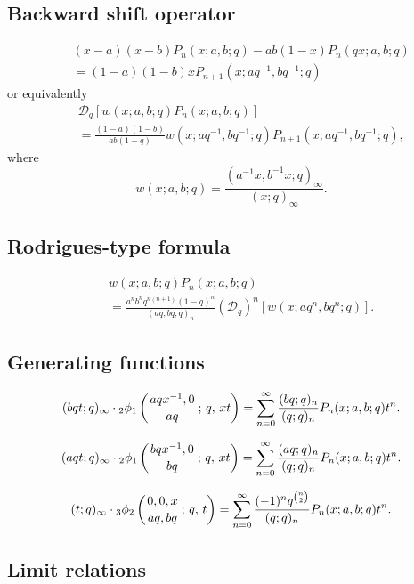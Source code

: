 \documentclass[envcountchap,graybox]{svmono}
\newcommand{\qhyp}[5]{\mbox{}_{#1}{\phi}_{#2}
\left(\genfrac{}{}{0pt}{}{#3}{#4}\,;\,q,\,#5\right)}
\newcommand{\qhyp}[5]{\,\mbox{}_{#1}\phi_{#2}\!\left(
  \genfrac{}{}{0pt}{}{#3}{#4};#5\right)}
\begin{document}
\subsection*{Backward shift operator}
\begin{eqnarray}
\label{shift2BigqLaguerreI}
& &(x-a)(x-b)P_n(x;a,b;q)-ab(1-x)P_n(qx;a,b;q)\nonumber\\
& &{}=(1-a)(1-b)xP_{n+1}(x;aq^{-1},bq^{-1};q)
\end{eqnarray}
or equivalently
\begin{eqnarray}
\label{shift2BigqLaguerreII}
& &\mathcal{D}_q\left[w(x;a,b;q)P_n(x;a,b;q)\right]\nonumber\\
& &{}=\frac{(1-a)(1-b)}{ab(1-q)}w(x;aq^{-1},bq^{-1};q)P_{n+1}(x;aq^{-1},bq^{-1};q),
\end{eqnarray}
where
$$w(x;a,b;q)=\frac{(a^{-1}x,b^{-1}x;q)_{\infty}}{(x;q)_{\infty}}.$$

\subsection*{Rodrigues-type formula}
\begin{eqnarray}
\label{RodBigqLaguerre}
& &w(x;a,b;q)P_n(x;a,b;q)\nonumber\\
& &{}=\frac{a^nb^nq^{n(n+1)}(1-q)^n}
{(aq,bq;q)_n}\left(\mathcal{D}_q\right)^n\left[w(x;aq^n,bq^n;q)\right].
\end{eqnarray}

\subsection*{Generating functions}
\begin{equation}
\label{GenBigqLaguerre1}
(bqt;q)_{\infty}\cdot\qhyp{2}{1}{aqx^{-1},0}{aq}{xt}
=\sum_{n=0}^{\infty}\frac{(bq;q)_n}{(q;q)_n}P_n(x;a,b;q)t^n.
\end{equation}

\begin{equation}
\label{GenBigqLaguerre2}
(aqt;q)_{\infty}\cdot\qhyp{2}{1}{bqx^{-1},0}{bq}{xt}
=\sum_{n=0}^{\infty}\frac{(aq;q)_n}{(q;q)_n}P_n(x;a,b;q)t^n.
\end{equation}

\begin{equation}
\label{GenBigqLaguerre3}
(t;q)_{\infty}\cdot\qhyp{3}{2}{0,0,x}{aq,bq}{t}=\sum_{n=0}^{\infty}
\frac{(-1)^nq^{\binom{n}{2}}}{(q;q)_n}P_n(x;a,b;q)t^n.
\end{equation}

\subsection*{Limit relations}
\end{document}
